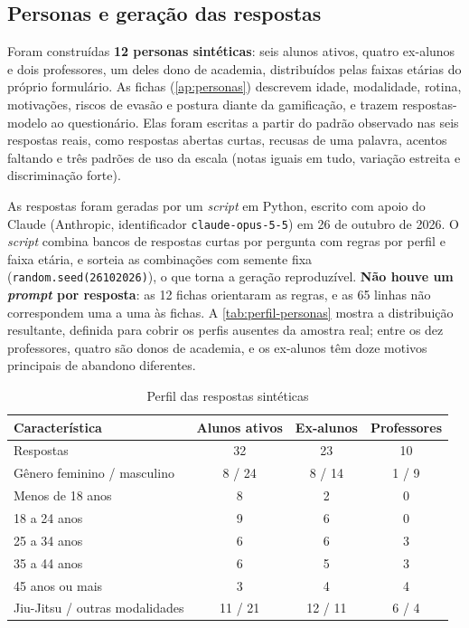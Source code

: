 \subsection{Personas e geração das respostas}

Foram construídas \textbf{12 personas sintéticas}: seis alunos ativos,
quatro ex-alunos e dois professores, um deles dono de academia,
distribuídos pelas faixas etárias do próprio formulário. As fichas
(\autoref{ap:personas}) descrevem idade, modalidade, rotina, motivações,
riscos de evasão e postura diante da gamificação, e trazem respostas-modelo
ao questionário. Elas foram escritas a partir do padrão observado nas seis
respostas reais, como respostas abertas curtas, recusas de uma palavra,
acentos faltando e três padrões de uso da escala (notas iguais em tudo,
variação estreita e discriminação forte).

As respostas foram geradas por um \textit{script} em Python, escrito com
apoio do Claude (Anthropic, identificador \texttt{claude-opus-5-5}) em
26 de outubro de 2026. O \textit{script} combina bancos de respostas
curtas por pergunta com regras por perfil e faixa etária, e sorteia as
combinações com semente fixa (\texttt{random.seed(26102026)}), o que
torna a geração reproduzível. \textbf{Não houve um \textit{prompt} por
resposta}: as 12 fichas orientaram as regras, e as 65 linhas não
correspondem uma a uma às fichas. A \autoref{tab:perfil-personas} mostra
a distribuição resultante, definida para cobrir os perfis ausentes da
amostra real; entre os dez professores, quatro são donos de academia, e
os ex-alunos têm doze motivos principais de abandono diferentes.

\begin{table}[!htb]
  \centering
  \caption{Perfil das respostas sintéticas}
  \label{tab:perfil-personas}
  \footnotesize
  \begin{tabular}{lccc}
    \toprule
    \textbf{Característica} & \textbf{Alunos ativos} & \textbf{Ex-alunos} & \textbf{Professores} \\
    \midrule
    Respostas                           & 32 & 23 & 10 \\
    Gênero feminino / masculino         & 8 / 24 & 8 / 14 & 1 / 9 \\
    Menos de 18 anos                    & 8 & 2 & 0 \\
    18 a 24 anos                        & 9 & 6 & 0 \\
    25 a 34 anos                        & 6 & 6 & 3 \\
    35 a 44 anos                        & 6 & 5 & 3 \\
    45 anos ou mais                     & 3 & 4 & 4 \\
    Jiu-Jitsu / outras modalidades      & 11 / 21 & 12 / 11 & 6 / 4 \\
    \bottomrule
  \end{tabular}
\end{table}

